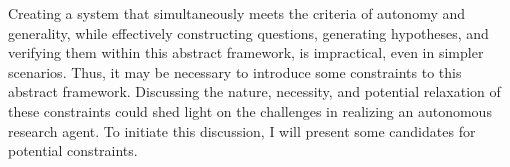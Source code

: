 Creating a system that simultaneously meets the criteria of autonomy and generality, while effectively constructing questions, generating hypotheses, and verifying them within this abstract framework, is impractical, even in simpler scenarios. Thus, it may be necessary to introduce some constraints to this abstract framework. Discussing the nature, necessity, and potential relaxation of these constraints could shed light on the challenges in realizing an autonomous research agent. To initiate this discussion, I will present some candidates for potential constraints.





